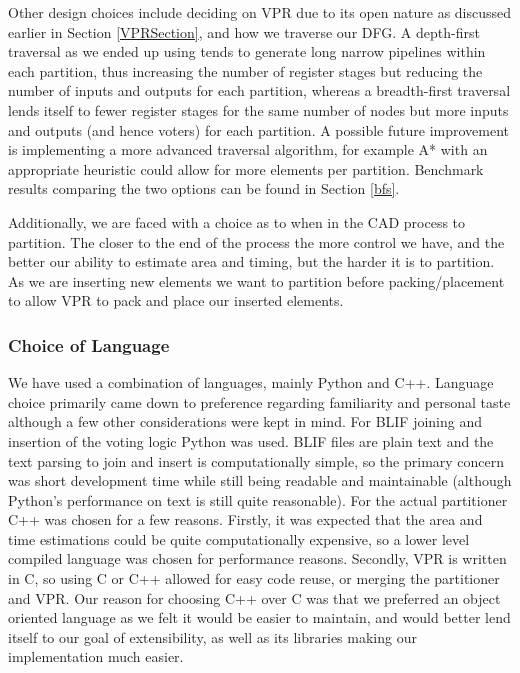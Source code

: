 \documentclass[12pt,final,oneside]{dwThesis} %
\begin{document}
   Other design choices include deciding on \gls{VPR} due to its open nature as
   discussed earlier in Section \ref{VPRSection}, and how we traverse our
   \gls{DFG}. A depth-first traversal as we ended up using tends to generate
   long narrow pipelines within each partition, thus increasing the number of
   register stages but reducing the number of inputs and outputs for each
   partition, whereas a breadth-first traversal lends itself to fewer register
   stages for the same number of nodes but more inputs and outputs (and hence
   voters) for each partition. A possible future improvement is implementing a
   more advanced traversal algorithm, for example A* with an appropriate
   heuristic could allow for more elements per partition. Benchmark results
   comparing the two options can be found in Section \ref{bfs}.

   Additionally, we are faced with a choice as to when in the \gls{CAD} process
   to partition. The closer to the end of the process the more control we have,
   and the better our ability to estimate area and timing, but the harder it is
   to partition. As we are inserting new elements we want to partition before
   packing/placement to allow \gls{VPR} to pack and place our inserted
   elements.

   \subsubsection{Choice of Language} We have used a combination of languages,
   mainly Python and C++. Language choice primarily came down to preference
   regarding familiarity and personal taste although a few other considerations
   were kept in mind.  For \gls{BLIF} joining and insertion of the voting logic
   Python was used. \gls{BLIF} files are plain text and the text parsing to
   join and insert is computationally simple, so the primary concern was short
   development time while still being readable and maintainable (although
   Python's performance on text is still quite
   reasonable)\cite{LanguageBenchmark}.  For the actual partitioner C++ was
   chosen for a few reasons. Firstly, it was expected that the area and time
   estimations could be quite computationally expensive, so a lower level
   compiled language was chosen for performance
   reasons\cite{LanguageBenchmark}. Secondly, \gls{VPR} is written in C, so
   using C or C++ allowed for easy code reuse, or merging the partitioner and
   \gls{VPR}. Our reason for choosing C++ over C was that we preferred an
   object oriented language as we felt it would be easier to maintain, and
   would better lend itself to our goal of extensibility, as well as its
   libraries making our implementation much easier.
\end{document}
